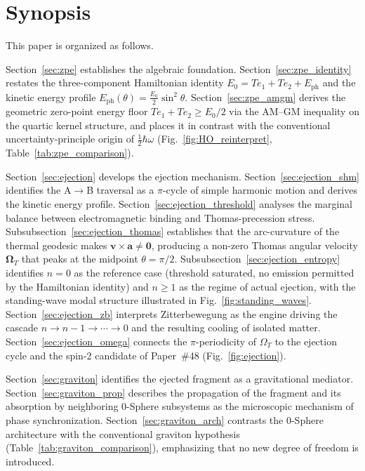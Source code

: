 \documentclass[%
 reprint, amsmath,amssymb, aps, prb, ]{revtex4-2}
\numberwithin{equation}{section}
\begin{document}
\section*{Synopsis}
\label{sec:synopsis}

This paper is organized as follows.

Section~\ref{sec:zpe} establishes the algebraic foundation.
Section~\ref{sec:zpe_identity} restates the three-component Hamiltonian identity $E_0 = Te_1 + Te_2 + E_{\text{ph}}$ and the kinetic energy profile $E_{\text{ph}}(\theta) = \tfrac{E_0}{2}\sin^2\!\theta$.
Section~\ref{sec:zpe_amgm} derives the geometric zero-point energy floor $Te_1 + Te_2 \geq E_0/2$ via the AM--GM inequality on the quartic kernel structure, and places it in contrast with the conventional uncertainty-principle origin of $\tfrac{1}{2}\hbar\omega$ (Fig.~\ref{fig:HO_reinterpret}, Table~\ref{tab:zpe_comparison}).

Section~\ref{sec:ejection} develops the ejection mechanism.
Section~\ref{sec:ejection_shm} identifies the A$\to$B traversal as a $\pi$-cycle of simple harmonic motion and derives the kinetic energy profile.
Section~\ref{sec:ejection_threshold} analyses the marginal balance between electromagnetic binding and Thomas-precession stress.
Subsubsection~\ref{sec:ejection_thomas} establishes that the arc-curvature of the thermal geodesic makes $\mathbf{v} \times \mathbf{a} \neq \mathbf{0}$, producing a non-zero Thomas angular velocity $\boldsymbol{\Omega}_T$ that peaks at the midpoint $\theta = \pi/2$.
Subsubsection~\ref{sec:ejection_entropy} identifies $n=0$ as the reference case (threshold saturated, no emission permitted by the Hamiltonian identity) and $n \geq 1$ as the regime of actual ejection, with the standing-wave modal structure illustrated in Fig.~\ref{fig:standing_waves}.
Section~\ref{sec:ejection_zb} interprets Zitterbewegung as the engine driving the cascade $n \to n-1 \to \cdots \to 0$ and the resulting cooling of isolated matter.
Section~\ref{sec:ejection_omega} connects the $\pi$-periodicity of $\Omega_T$ to the ejection cycle and the spin-2 candidate of Paper~\#48 (Fig.~\ref{fig:ejection}).

Section~\ref{sec:graviton} identifies the ejected fragment as a gravitational mediator.
Section~\ref{sec:graviton_prop} describes the propagation of the fragment and its absorption by neighboring 0-Sphere subsystems as the microscopic mechanism of phase synchronization.
Section~\ref{sec:graviton_arch} contrasts the 0-Sphere architecture with the conventional graviton hypothesis (Table~\ref{tab:graviton_comparison}), emphasizing that no new degree of freedom is introduced.
\end{document}
